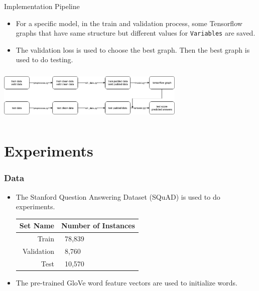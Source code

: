 \documentclass{beamer}
\begin{document}
\begin{frame}{Implementation Pipeline}
    \begin{itemize}
        \item For a specific model, in the train and validation process, some Tensorflow graphs that have same structure but different values for {\tt Variables} are saved.
        \item The validation loss is used to choose the best graph. Then the best graph is used to do testing.
    \end{itemize}
    \begin{center}
      \includegraphics[width=9cm, height=2.5cm]{figures/pipeline.png}
    \end{center}
\end{frame}

\section{Experiments}

\begin{frame} \frametitle{Data}
    \begin{itemize}
        \item The Stanford Question Answering Dataset (SQuAD) is used to do experiments.
        \begin{table}[htbp]\centering
          \begin{tabular}{|r|l|} \hline
            Set Name & Number of Instances \\ \hline\hline
            Train & \ 78,839 \\
            Validation & \ 8,760 \\
            Test & \ 10,570 \\ \hline
          \end{tabular}
        \end{table}
        \item The pre-trained GloVe word feature vectors are used to initialize words.
    \end{itemize}
\end{frame}
\end{document}
